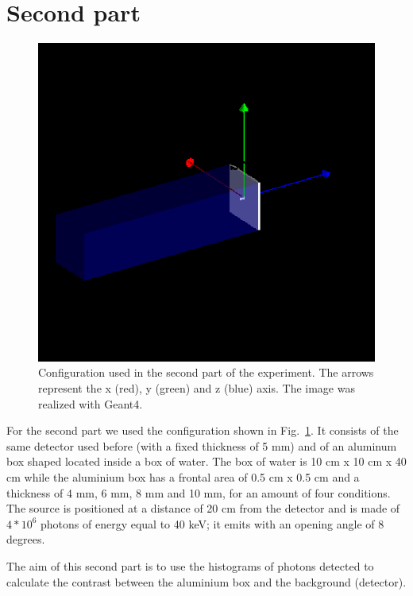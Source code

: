 \documentclass[a4paper]{article}
\begin{document}
\section{Second part}
\begin{figure}[!htb]
  \centering
  \includegraphics[width=0.6\columnwidth]{detector2.png}
  \caption{Configuration used in the second part of the experiment. The arrows represent the x (red), y (green) and z (blue) axis. The image was realized with Geant4.}
  \label{fig:conf2}
\end{figure}
For the second part we used the configuration shown in Fig.~\ref{fig:conf2}. It consists of the same detector used before (with a fixed thickness of 5 mm) and of an aluminum box shaped located inside a box of water. The box of water is 10 cm x 10 cm x 40 cm while the aluminium box has a frontal area of 0.5 cm x 0.5 cm and a thickness of 4 mm, 6 mm, 8 mm and 10 mm, for an amount of four conditions. The source is positioned at a distance of 20 cm from the detector and is made of $4*10^{6}$ photons of energy equal to 40 keV; it emits with an opening angle of 8 degrees.

The aim of this second part is to use the histograms of photons detected to calculate the contrast between the aluminium box and the background (detector).
\end{document}
